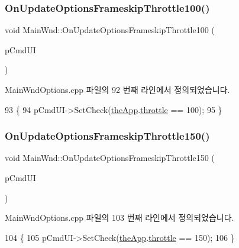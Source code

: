 \subsubsection{\texorpdfstring{On\+Update\+Options\+Frameskip\+Throttle100()}{OnUpdateOptionsFrameskipThrottle100()}}
{\footnotesize\ttfamily void Main\+Wnd\+::\+On\+Update\+Options\+Frameskip\+Throttle100 (\begin{DoxyParamCaption}\item[{C\+Cmd\+UI $\ast$}]{p\+Cmd\+UI }\end{DoxyParamCaption})\hspace{0.3cm}{\ttfamily [protected]}}



Main\+Wnd\+Options.\+cpp 파일의 92 번째 라인에서 정의되었습니다.


\begin{DoxyCode}
93 \{
94   pCmdUI->SetCheck(\mbox{\hyperlink{_v_b_a_8cpp_a8095a9d06b37a7efe3723f3218ad8fb3}{theApp}}.\mbox{\hyperlink{class_v_b_a_af21b98509a2589b38e4787f065b40a2b}{throttle}} == 100);
95 \}
\end{DoxyCode}
\mbox{\label{class_main_wnd_a22dde850fc137ea95bd63898d35086d1}} 
\subsubsection{\texorpdfstring{On\+Update\+Options\+Frameskip\+Throttle150()}{OnUpdateOptionsFrameskipThrottle150()}}
{\footnotesize\ttfamily void Main\+Wnd\+::\+On\+Update\+Options\+Frameskip\+Throttle150 (\begin{DoxyParamCaption}\item[{C\+Cmd\+UI $\ast$}]{p\+Cmd\+UI }\end{DoxyParamCaption})\hspace{0.3cm}{\ttfamily [protected]}}



Main\+Wnd\+Options.\+cpp 파일의 103 번째 라인에서 정의되었습니다.


\begin{DoxyCode}
104 \{
105   pCmdUI->SetCheck(\mbox{\hyperlink{_v_b_a_8cpp_a8095a9d06b37a7efe3723f3218ad8fb3}{theApp}}.\mbox{\hyperlink{class_v_b_a_af21b98509a2589b38e4787f065b40a2b}{throttle}} == 150);
106 \}
\end{DoxyCode}
\mbox{\label{class_main_wnd_a1e2ba1a5a6a690c4a2cd946f9621dbd2}} 
